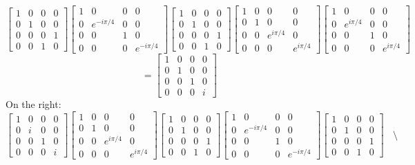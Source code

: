 $$\begin{bmatrix} 1 & 0 & 0 &0 \\ 0 & 1 & 0 & 0 \\ 0 & 0 & 0 & 1 \\ 0 & 0 & 1 & 0\end{bmatrix}
\begin{bmatrix} 1 & 0 & 0 &0 \\ 0 & e^{-i\pi/4} & 0 & 0 \\ 0 & 0 & 1 & 0 \\ 0 & 0 & 0 & e^{-i\pi/4}\end{bmatrix}
\begin{bmatrix} 1 & 0 & 0 &0 \\ 0 & 1 & 0 & 0 \\ 0 & 0 & 0 & 1 \\ 0 & 0 & 1 & 0\end{bmatrix}
\begin{bmatrix} 1 & 0 & 0 &0 \\ 0 & 1 & 0 & 0 \\ 0 & 0 & e^{i\pi/4} & 0 \\ 0 & 0 & 0 & e^{i\pi/4}\end{bmatrix}
\begin{bmatrix} 1 & 0 & 0 &0 \\ 0 & e^{i\pi/4} & 0 & 0 \\ 0 & 0 & 1 & 0 \\ 0 & 0 & 0 & e^{i\pi/4}\end{bmatrix}$$
$$ = \begin{bmatrix} 1 & 0 & 0 &0 \\ 0 & 1 & 0 & 0 \\ 0 & 0 & 1 & 0 \\ 0 & 0 & 0 & i\end{bmatrix}$$
On the right:
$$
\begin{bmatrix} 1 & 0 & 0 &0 \\ 0 & i & 0 & 0 \\ 0 & 0 & 1 & 0 \\ 0 & 0 & 0 & i\end{bmatrix}
\begin{bmatrix} 1 & 0 & 0 &0 \\ 0 & 1 & 0 & 0 \\ 0 & 0 & e^{i\pi/4} & 0 \\ 0 & 0 & 0 & e^{i\pi/4}\end{bmatrix}
\begin{bmatrix} 1 & 0 & 0 &0 \\ 0 & 1 & 0 & 0 \\ 0 & 0 & 0 & 1 \\ 0 & 0 & 1 & 0\end{bmatrix}
\begin{bmatrix} 1 & 0 & 0 &0 \\ 0 & e^{-i\pi/4} & 0 & 0 \\ 0 & 0 & 1 & 0 \\ 0 & 0 & 0 & e^{-i\pi/4}\end{bmatrix}
\begin{bmatrix} 1 & 0 & 0 &0 \\ 0 & 1 & 0 & 0 \\ 0 & 0 & 0 & 1 \\ 0 & 0 & 1 & 0\end{bmatrix}\ \ \ \ \setminus$$
